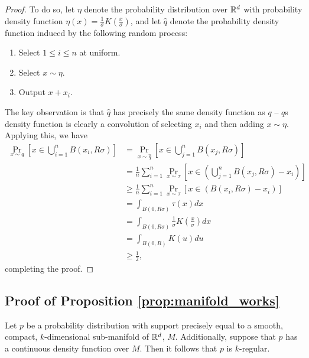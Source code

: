 \begin{proof}
To do so, let $\eta$ denote the probability distribution over $\mathbb{R}^d$ with probability density function $\eta(x) = \frac{1}{\sigma}K(\frac{x}{\sigma})$, and let $\hat{q}$ denote the probability density function induced by the following random process:
\begin{enumerate}
	\item Select $1 \leq i \leq n$ at uniform.
	\item Select $x \sim \eta$.
	\item Output $x + x_i$.
\end{enumerate}
The key observation is that $\hat{q}$ has precisely the same density function as $q$ -- $q$s density function is clearly a convolution of selecting $x_i$ and then adding $x \sim \eta$. Applying this, we have
\begin{equation*}
\begin{split}
\Pr_{x \sim q}\left[x \in \bigcup_{i= 1}^n B(x_i, R\sigma)\right] &= \Pr_{x \sim \hat{q}}\left[x \in \bigcup_{j= 1}^n B(x_j, R\sigma)\right] \\
&= \frac{1}{n} \sum_{i=1}^n \Pr_{x \sim \tau}\left[x \in \left(\bigcup_{j= 1}^n B(x_j, R\sigma) - x_i\right)\right]\\
&\geq \frac{1}{n} \sum_{i=1}^n \Pr_{x \sim \tau} \left[x \in \left(B(x_i, R\sigma) - x_i\right)\right] \\
&= \int_{B(0, R\sigma)} \tau(x)dx \\
&= \int_{B(0, R\sigma)} \frac{1}{\sigma} K\left(\frac{x}{\sigma}\right)dx \\
&= \int_{B(0, R)} K(u)du \\
&\geq \frac{1}{2},
\end{split}
\end{equation*}
completing the proof. 



\end{proof}

\subsection{Proof of Proposition \ref{prop:manifold_works}}


\begin{proposition} Let $p$ be a probability distribution with support precisely equal to a smooth, compact, $k$-dimensional sub-manifold of $\mathbb{R}^d$, $M$. Additionally, suppose that $p$ has a continuous density function over $M$. Then it follows that $p$ is $k$-regular.
\end{proposition}

